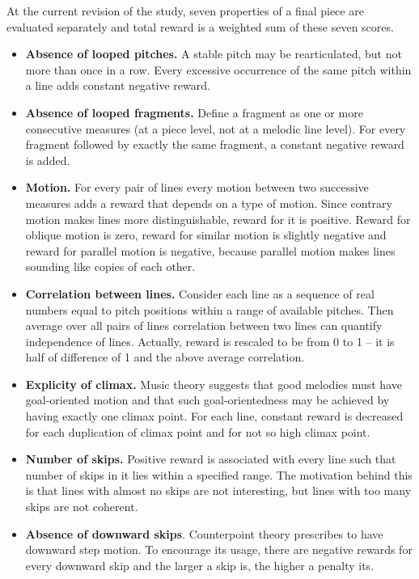 \documentclass{article}
\begin{document}
At the current revision of the study, seven properties of a final piece are evaluated separately and total reward is a weighted sum of these seven scores.

\begin{itemize}
	\item \textbf{Absence of looped pitches.} A stable pitch may be rearticulated, but not more than once in a row. Every excessive occurrence of the same pitch within a line adds constant negative reward.
    \item \textbf{Absence of looped fragments.} Define a fragment as one or more consecutive measures (at a piece level, not at a melodic line level). For every fragment followed by exactly the same fragment, a constant negative reward is added.
	\item \textbf{Motion.} For every pair of lines every motion between two successive measures adds a reward that depends on a type of motion. Since contrary motion makes lines more distinguishable, reward for it is positive. Reward for oblique motion is zero, reward for similar motion is slightly negative and reward for parallel motion is negative, because parallel motion makes lines sounding like copies of each other.
	\item \textbf{Correlation between lines.} Consider each line as a sequence of real numbers equal to pitch positions within a range of available pitches. Then average over all pairs of lines correlation between two lines can quantify independence of lines. Actually, reward is rescaled to be from 0 to 1 -- it is half of difference of 1 and the above average correlation.
    \item \textbf{Explicity of climax.} Music theory suggests that good melodies must have goal-oriented motion and that such goal-orientedness may be achieved by having exactly one climax point. For each line, constant reward is decreased for each duplication of climax point and for not so high climax point.
    \item \textbf{Number of skips.} Positive reward is associated with every line such that number of skips in it lies within a specified range. The motivation behind this is that lines with almost no skips are not interesting, but lines with too many skips are not coherent.
    \item \textbf{Absence of downward skips}. Counterpoint theory prescribes to have downward step motion. To encourage its usage, there are negative rewards for every downward skip and the larger a skip is, the higher a penalty its.
\end{itemize}
\end{document}
